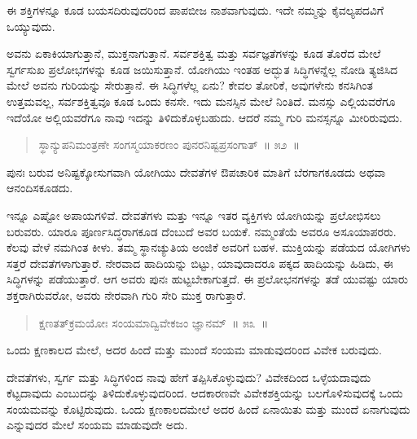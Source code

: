 \vspace{-0.3cm}

ಈ ಶಕ್ತಿಗಳನ್ನೂ ಕೂಡ ಬಯಸದಿರುವುದರಿಂದ ಪಾಪಬೀಜ ನಾಶವಾಗುವುದು. ಇದೇ ನಮ್ಮನ್ನು ಕೈವಲ್ಯಪದವಿಗೆ ಒಯ್ಯುವುದು. 

ಅವನು ಏಕಾಕಿಯಾಗುತ್ತಾನೆ, ಮುಕ್ತನಾಗುತ್ತಾನೆ. ಸರ್ವಶಕ್ತಿತ್ವ ಮತ್ತು ಸರ್ವಜ್ಞತೆಗಳನ್ನು ಕೂಡ ತೊರೆದ ಮೇಲೆ ಸ್ವರ್ಗಸುಖ ಪ್ರಲೋಭಗಳನ್ನು ಕೂಡ ಜಯಿಸುತ್ತಾನೆ. ಯೋಗಿಯು ಇಂತಹ ಅದ್ಭುತ ಸಿದ್ಧಿಗಳನ್ನೆಲ್ಲ ನೋಡಿ ತ್ಯಜಿಸಿದ ಮೇಲೆ ಅವನು ಗುರಿಯನ್ನು ಸೇರುತ್ತಾನೆ. ಈ ಸಿದ್ಧಿಗಳೆಲ್ಲ ಏನು? ಕೇವಲ ತೋರಿಕೆ, ಅವುಗಳೇನು ಕನಸಿಗಿಂತ ಉತ್ತಮವಲ್ಲ, ಸರ್ವಶಕ್ತಿತ್ವವೂ ಕೂಡ ಒಂದು ಕನಸೇ. ಇದು ಮನಸ್ಸಿನ ಮೇಲೆ ನಿಂತಿದೆ. ಮನಸ್ಸು ಎಲ್ಲಿಯವರೆಗೂ ಇದೆಯೋ ಅಲ್ಲಿಯವರೆಗೂ ನಾವು ಇದನ್ನು ತಿಳಿದುಕೊಳ್ಳಬಹುದು. ಆದರೆ ನಮ್ಮ ಗುರಿ ಮನಸ್ಸನ್ನೂ ಮೀರಿರುವುದು. 

\vspace{-0.3cm}

\begin{verse}
ಸ್ಥಾನ್ಯುಪನಿಮಂತ್ರಣೇ ಸಂಗಸ್ಮಯಾಕರಣಂ ಪುನರನಿಷ್ಟಪ್ರಸಂಗಾತ್​~॥ ೫೨~॥
\end{verse}

\vspace{-0.3cm}

ಪುನಃ ಬರುವ ಅನಿಷ್ಟಕ್ಕೋಸುಗವಾಗಿ ಯೋಗಿಯು ದೇವತೆಗಳ ಔಪಚಾರಿಕ ಮಾತಿಗೆ ಬೆರಗಾಗಕೂಡದು ಅಥವಾ ಆನಂದಿಸಕೂಡದು. 

ಇನ್ನೂ ಎಷ್ಟೋ ಅಪಾಯಗಳಿವೆ. ದೇವತೆಗಳು ಮತ್ತು ಇನ್ನೂ ಇತರ ವ್ಯಕ್ತಿಗಳು ಯೋಗಿಯನ್ನು ಪ್ರಲೋಭಿಸಲು ಬರುವರು. ಯಾರೂ ಪೂರ್ಣಸಿದ್ಧರಾಗಕೂಡ ದೆಂಬುದೆ ಅವರ ಬಯಕೆ. ನಮ್ಮಂತೆಯೆ ಅವರೂ ಅಸೂಯಾಪರರು. ಕೆಲವು ವೇಳೆ ನಮಗಿಂತ ಕೀಳು. ತಮ್ಮ ಸ್ಥಾನಚ್ಯುತಿಯ ಅಂಜಿಕೆ ಅವರಿಗೆ ಬಹಳ. ಮುಕ್ತಿಯನ್ನು ಪಡೆಯದ ಯೋಗಿಗಳು ಸತ್ತರೆ ದೇವತೆಗಳಾಗುತ್ತಾರೆ. ನೇರವಾದ ಹಾದಿಯನ್ನು ಬಿಟ್ಟು, ಯಾವುದಾದರೂ ಪಕ್ಕದ ಹಾದಿಯನ್ನು ಹಿಡಿದು, ಈ ಸಿದ್ಧಿಗಳನ್ನು ಪಡೆಯುತ್ತಾರೆ. ಆಗ ಅವರು ಪುನಃ ಹುಟ್ಟಬೇಕಾಗುತ್ತದೆ. ಈ ಪ್ರಲೋಭನಗಳನ್ನು ತಡೆ ಯುವಷ್ಟು ಯಾರು ಶಕ್ತರಾಗಿರುವರೋ, ಅವರು ನೇರವಾಗಿ ಗುರಿ ಸೇರಿ ಮುಕ್ತ ರಾಗುತ್ತಾರೆ. 

\vspace{-0.3cm}

\begin{verse}
ಕ್ಷಣತತ್​ಕ್ರಮಯೋಃ ಸಂಯಮಾದ್ವಿವೇಕಜಂ ಜ್ಞಾನಮ್​~॥ ೫೩~॥
\end{verse}

\vspace{-0.3cm}

ಒಂದು ಕ್ಷಣಕಾಲದ ಮೇಲೆ, ಅದರ ಹಿಂದೆ ಮತ್ತು ಮುಂದೆ ಸಂಯಮ ಮಾಡುವುದರಿಂದ ವಿವೇಕ ಬರುವುದು. 

ದೇವತೆಗಳು, ಸ್ವರ್ಗ ಮತ್ತು ಸಿದ್ಧಿಗಳಿಂದ ನಾವು ಹೇಗೆ ತಪ್ಪಿಸಿಕೊಳ್ಳುವುದು? ವಿವೇಕದಿಂದ ಒಳ್ಳೆಯದಾವುದು ಕೆಟ್ಟದಾವುದು ಎಂಬುದನ್ನು ತಿಳಿದುಕೊಳ್ಳುವುದರಿಂದ. ಆದಕಾರಣವೇ ವಿವೇಕಶಕ್ತಿಯನ್ನು ಬಲಗೊಳಿಸುವುದಕ್ಕೆ ಒಂದು ಸಂಯಮವನ್ನು ಕೊಟ್ಟಿರುವುದು. ಒಂದು ಕ್ಷಣಕಾಲದಮೇಲೆ ಅದರ ಹಿಂದೆ ಏನಾಯಿತು ಮತ್ತು ಮುಂದೆ ಏನಾಗುವುದು ಎನ್ನುವುದರ ಮೇಲೆ ಸಂಯಮ ಮಾಡುವುದೇ ಅದು. 

\vspace{-0.3cm}

